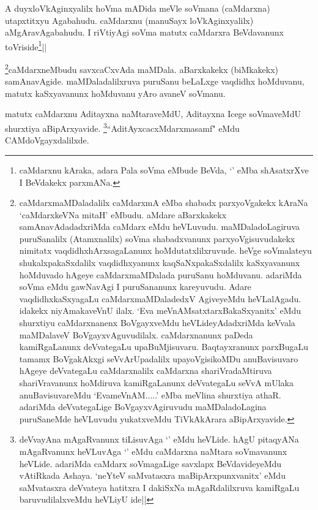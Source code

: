 \begin{artha}
A duyxloVkAginxyalilx hoVma mADida meVle soVmana (caMdarxna) 
utapxtitxyu Agabahudu. caMdarxnu (manuSayx loVkAginxyalilx) 
aMgAravAgabahudu. I riVtiyAgi soVma matutx caMdarxra BeVdavanunx 
toVriside\footnote[2]{caMdarxnu kAraka, adara Pala soVma eMbude BeVda, 
`\stext' eMba shAsatxrXve I BeVdakekx parxmANa.}||
\end{artha}

\begin{artha}
\footnote[3]{caMdarxmaMDaladalilx caMdarxmA eMba shabadx parxyoVgakekx 
kAraNa `caMdarxkeVNa mitaH' eMbudu. aMdare aBarxkakekx 
samAnavAdadadxriMda caMdarx eMdu heVLuvudu. maMDaladoLagiruva 
puruSanalilx (Atamxnalilx) soVma shabadxvanunx parxyoVgisuvudakekx 
nimitatx vaqdidhxhArxsagaLanunx hoMdutatxlilxruvude. heVge soVmalateyu 
shukalxpakaSxdalilx vaqdidhxyanunx kaqSaNxpakaSxdalilx kaSxyavanunx 
hoMduvado hAgeye caMdarxmaMDalada puruSanu hoMduvanu. adariMda soVma 
eMdu gawNavAgi I puruSananunx kareyuvudu. Adare vaqdidhxkaSxyagaLu 
caMdarxmaMDaladedxV AgiveyeMdu heVLalAgadu. idakekx niyAmakaveVnU 
ilalx. `Eva meVnAMsatxtarxBakaSxyanitx' eMdu shurxtiyu caMdarxnanenx 
BoVgayxveMdu heVLideyAdadxriMda keVvala maMDalaveV 
BoVgayxvAguvudilalx. caMdarxnanunx paDeda kamiRgaLanunx deVvategaLu 
upaBuMjisuvaru. Baqtayxranunx parxBugaLu tamamx BoVgakAkxgi 
seVvArUpadalilx upayoVgisikoMDu anuBavisuvaro hAgeye deVvategaLu 
caMdarxnalilx caMdarxna shariVradaMtiruva shariVravanunx hoMdiruva 
kamiRgaLanunx deVvategaLu seVvA mUlaka anuBavisuvareMdu 
`EvameVnAM.....' eMba meVlina shurxtiya athaR. adariMda deVvategaLige 
BoVgayxvAgiruvudu maMDaladoLagina puruSaneMde heVLuvudu yukatxveMdu 
TiVkAkArara aBipArxyavide.}caMdarxneMbudu savxcaCxvAda maMDala. aBarxkakekx 
(biMkakekx) samAnavAgide. maMDaladalilxruva puruSanu beLaLxge vaqdidhx 
hoMduvanu, matutx kaSxyavanunx hoMduvanu yAro avaneV soVmanu.
\end{artha}

\begin{artha}
matutx caMdarxnu Aditayxna naMtaraveMdU, Aditayxna Icege soVmaveMdU 
shurxtiya aBipArxyavide. \footnote[1]{deVvayAna mAgaRvanunx tiLisuvAga 
`\stext' eMdu heVLide. hAgU pitaqyANa mAgaRvanunx heVLuvAga `\stext' 
eMdu caMdarxna naMtara soVmavanunx heVLide. adariMda caMdarx 
soVmagaLige savxlapx BeVdavideyeMdu vAtiRkada Ashaya. `neYteV 
saMvatasxra maBipArxpunxvanitx' eMdu saMvatasxra deVvateya hatitxra I 
dakiSxNa mAgaRdalilxruva kamiRgaLu baruvudilalxveMdu heVLiyU ide||}``AditAyxcacxMdarxmasamf" eMdu 
CAMdoVgayxdalilxde.
\end{artha}


